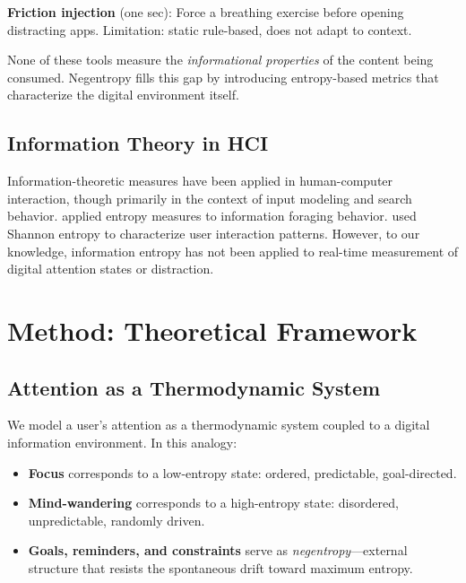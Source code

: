 \documentclass[10pt,letterpaper]{article}
\begin{document}
\textbf{Friction injection} (one sec): Force a breathing exercise before opening distracting apps. Limitation: static rule-based, does not adapt to context.

None of these tools measure the \emph{informational properties} of the content being consumed. Negentropy fills this gap by introducing entropy-based metrics that characterize the digital environment itself.

\subsection{Information Theory in HCI}

Information-theoretic measures have been applied in human-computer interaction, though primarily in the context of input modeling and search behavior. \cite{pirolli1999information} applied entropy measures to information foraging behavior. \cite{arfein2013characterizing} used Shannon entropy to characterize user interaction patterns. However, to our knowledge, information entropy has not been applied to real-time measurement of digital attention states or distraction.

\section{Method: Theoretical Framework}
\label{sec:method}

\subsection{Attention as a Thermodynamic System}

We model a user's attention as a thermodynamic system coupled to a digital information environment. In this analogy:

\begin{itemize}[noitemsep]
    \item \textbf{Focus} corresponds to a low-entropy state: ordered, predictable, goal-directed.
    \item \textbf{Mind-wandering} corresponds to a high-entropy state: disordered, unpredictable, randomly driven.
    \item \textbf{Goals, reminders, and constraints} serve as \emph{negentropy}---external structure that resists the spontaneous drift toward maximum entropy.
\end{itemize}
\end{document}
